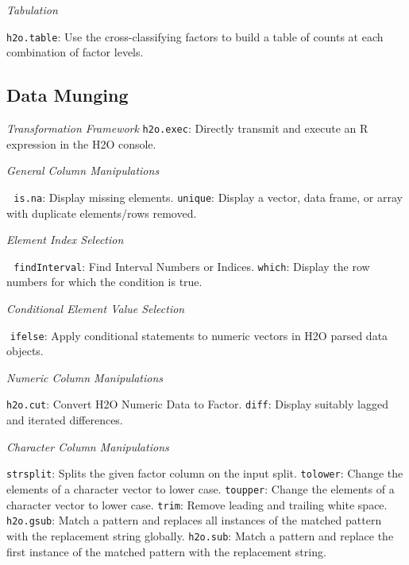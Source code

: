 \documentclass[11pt]{article}
\begin{document}
{{{\emph{Tabulation}\par
{\texttt{h2o.table}}: Use the cross-classifying factors to build a table of counts at each combination of factor levels.

\subsection{Data Munging}\par

\emph{Transformation Framework}\newline
{\texttt{h2o.exec}}: Directly transmit and execute an R expression in the H2O console.\newline

\emph{General Column Manipulations}\par 
{\texttt{is.na}}: Display missing elements.  \newline
{\texttt{unique}}: Display a vector, data frame, or array with duplicate elements/rows removed.\newline

\emph{Element Index Selection}\par 
{\texttt{findInterval}}: Find Interval Numbers or Indices.\newline
{\texttt{which}}: Display the row numbers for which the condition is true.\newline

\emph{Conditional Element Value Selection}\par {\texttt{ifelse}}: Apply conditional statements to numeric vectors in H2O parsed data objects.\newline

\emph{Numeric Column Manipulations}\par
{\texttt{h2o.cut}}: Convert H2O Numeric Data to Factor. \newline
{\texttt{diff}}: Display suitably lagged and iterated differences.\newline

\emph{Character Column Manipulations}\par
{\texttt{strsplit}}: Splits the given factor column on the input split. \newline
{\texttt{tolower}}: Change the elements of a character vector to lower case. \newline
{\texttt{toupper}}: Change the elements of a character vector to lower case. \newline
{\texttt{trim}}: Remove leading and trailing white space.\newline
{\texttt{h2o.gsub}}: Match a pattern and replaces all instances of the matched pattern with the replacement string globally. \newline
{\texttt{h2o.sub}}: Match a pattern and replace the first instance of the matched pattern with the replacement string.\newline

}}}
\end{document}
